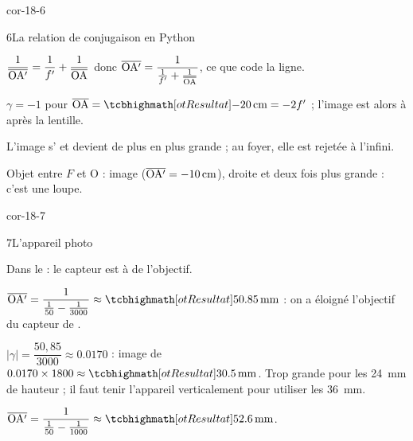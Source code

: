 \begin{blocLivre}{cor-18-6}
\begin{corrige}{6}{La relation de conjugaison en Python}
\begin{questions}
\item $\dfrac{1}{\overline{\mathrm{OA'}}}=\dfrac{1}{f'}+\dfrac{1}{\overline{\mathrm{OA}}}$ donc $\overline{\mathrm{OA'}}=\dfrac{1}{\frac{1}{f'}+\frac{1}{\overline{\mathrm{OA}}}}$, ce que code la ligne.
\item $\gamma=-1$ pour $\alg{OA}=\res{\qty{-20}{cm}}=-2f'$ ; l'image est alors à  après la lentille.
\item L'image s' et devient de plus en plus grande ; au foyer, elle est rejetée à l'infini.
\item Objet entre $F$ et O : image  ($\overline{\mathrm{OA'}}=\qty{-10}{cm}$), droite et deux fois plus grande : c'est une loupe.
\end{questions}
\end{corrige}
\end{blocLivre}
\begin{blocLivre}{cor-18-7}
\begin{corrige}{7}{L'appareil photo}
\begin{questions}
\item Dans le  : le capteur est à  de l'objectif.
\item $\alg{OA'}=\dfrac{1}{\frac{1}{50}-\frac{1}{3000}}\approx\res{\qty{50,85}{mm}}$ : on a éloigné l'objectif du capteur de .
\item $|\gamma|=\dfrac{50{,}85}{3000}\approx\num{0,0170}$ : image de $\num{0,0170}\times1800\approx\res{\qty{30,5}{mm}}$. Trop grande pour les \qty{24}{mm} de hauteur ; il faut tenir
l'appareil verticalement pour utiliser les \qty{36}{mm}.
\item $\alg{OA'}=\dfrac{1}{\frac{1}{50}-\frac{1}{1000}}\approx\res{\qty{52,6}{mm}}$.
\end{questions}
\end{corrige}
\end{blocLivre}
